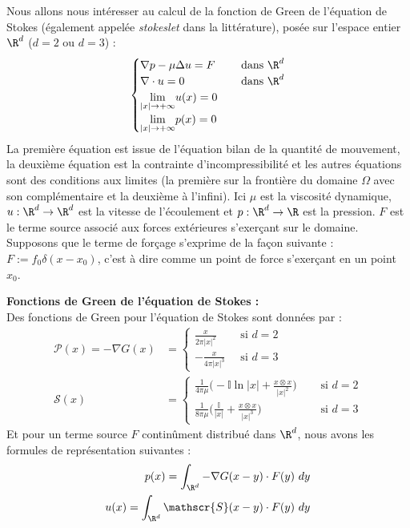 Nous allons nous intéresser au calcul de la fonction de Green de l'équation de Stokes (également appelée \textit{stokeslet} dans la littérature), posée sur l'espace entier $\R^d$ ($d=2$ ou $d=3$) :
$$\begin{cases}
    \nabla p - \mu \Delta u = F \quad &\text{ dans } \R^d \\
    \nabla \cdot u = 0 &\text{ dans } \R^d \\
    \underset{|x| \to +\infty}{\lim} u(x) = 0 \\
    \underset{|x| \to +\infty}{\lim} p(x) = 0
\end{cases}$$
La première équation est issue de l'équation bilan de la quantité de mouvement, la deuxième équation est la contrainte d'incompressibilité et les autres équations sont des conditions aux limites (la première sur la frontière du domaine $\Omega$ avec son complémentaire et la deuxième à l'infini).
Ici $\mu$ est la viscosité dynamique, $u : \R^d \to \R^d $ est la vitesse de l'écoulement et $p : \R^d \to \R$ est la pression. $F$ est le terme source associé aux forces extérieures s'exerçant sur le domaine.\\
Supposons que le terme de forçage s'exprime de la façon suivante : $F := f_0 \delta (x-x_0)$, c'est à dire comme un point de force s'exerçant en un point $x_0$.
\begin{theorembox}
    \begin{theorem} \textbf{Fonctions de Green de l'équation de Stokes :}\\
        Des fonctions de Green pour l'équation de Stokes sont données par : 
        \begin{align*}
            \mathcal{P}(x) = - \nabla G(x) &= 
            \begin{cases}
                 \frac{x}{2\pi |x|^2} \quad &\text{ si } d = 2 \\
                 -\frac{x}{4\pi |x|^3} &\text{ si } d = 3
            \end{cases} \\
            \mathscr{S}(x) &= 
            \begin{cases}
                 \frac{1}{4\pi\mu}\Big( - \mathbb{I}\ln |x| + \frac{x \otimes x}{|x|^2} \Big) \quad &\text{ si } d = 2 \\
                 \frac{1}{8\pi\mu}\Big( \frac{\mathbb{I}}{|x|} + \frac{x \otimes x}{|x|^3} \Big) &\text{ si } d = 3
            \end{cases}
        \end{align*}
    Et pour un terme source $F$ continûment distribué dans $\R^d$, nous avons les formules de représentation suivantes :
    \begin{align*}
        p(x) = \int_{\R^d} -\nabla G(x - y) \cdot F(y) \ dy \\
        u(x) = \int_{\R^d} \mathscr{S}(x-y) \cdot F(y) \ dy
    \end{align*}
    \end{theorem}
\end{theorembox}


